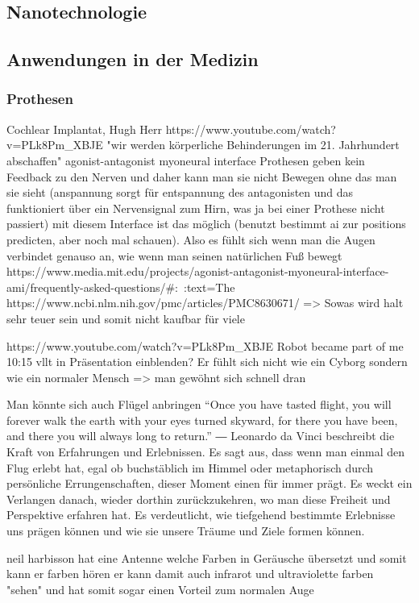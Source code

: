 \documentclass[a4paper,
DIV=13,
12pt,
BCOR=10mm,
department=FakEI,
twoside,
parskip=half,
automark,
]{OTHRartcl}
\begin{document}
\subsection*{Nanotechnologie}

\subsection*{Anwendungen in der Medizin}
\subsubsection*{Prothesen}
Cochlear Implantat, Hugh Herr https://www.youtube.com/watch?v=PLk8Pm_XBJE "wir werden körperliche Behinderungen im 21. Jahrhundert abschaffen"
agonist-antagonist myoneural interface Prothesen geben kein Feedback zu den Nerven und daher kann man sie nicht Bewegen ohne das man sie sieht
(anspannung sorgt für entspannung des antagonisten und das funktioniert über ein Nervensignal zum Hirn, was ja bei einer Prothese nicht passiert)
mit diesem Interface ist das möglich (benutzt bestimmt ai zur positions predicten, aber noch mal schauen). Also es fühlt sich wenn man die Augen 
verbindet genauso an, wie wenn man seinen natürlichen Fuß bewegt
https://www.media.mit.edu/projects/agonist-antagonist-myoneural-interface-ami/frequently-asked-questions/#:~:text=The%
https://www.ncbi.nlm.nih.gov/pmc/articles/PMC8630671/
=> Sowas wird halt sehr teuer sein und somit nicht kaufbar für viele

https://www.youtube.com/watch?v=PLk8Pm_XBJE Robot became part of me 10:15 vllt in Präsentation einblenden? Er fühlt sich nicht wie ein Cyborg
sondern wie ein normaler Mensch => man gewöhnt sich schnell dran

Man könnte sich auch Flügel anbringen
“Once you have tasted flight, you will forever walk the earth with your eyes turned skyward, for there you have been, and there you will always long to return.”
― Leonardo da Vinci
beschreibt die Kraft von Erfahrungen und Erlebnissen. Es sagt aus, dass wenn man einmal den Flug erlebt hat, egal ob buchstäblich im Himmel oder metaphorisch durch persönliche Errungenschaften,
dieser Moment einen für immer prägt. Es weckt ein Verlangen danach, wieder dorthin zurückzukehren, wo man diese Freiheit und Perspektive erfahren hat. Es verdeutlicht, wie tiefgehend bestimmte Erlebnisse uns prägen können und wie sie unsere Träume und Ziele formen können.

neil harbisson hat eine Antenne welche Farben in Geräusche übersetzt und somit kann er farben hören er kann damit auch infrarot und ultraviolette farben "sehen" und hat somit sogar einen Vorteil zum normalen Auge
\end{document}
